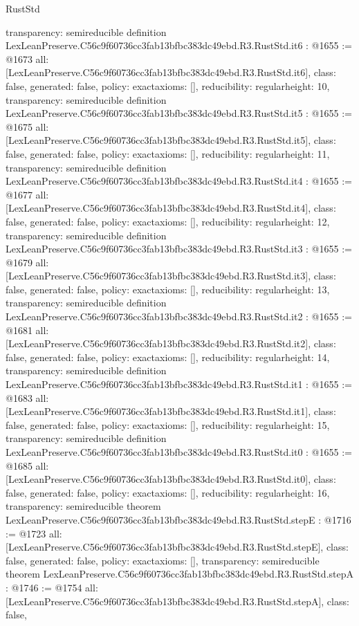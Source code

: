 \begin{lexlean}{RustStd}
\begin{coremodule}
{  transparency: semireducible
}
definition LexLeanPreserve.C56c9f60736cc3fab13bfbc383dc49ebd.R3.RustStd.it6 : @1655 := @1673 {
  all: [LexLeanPreserve.C56c9f60736cc3fab13bfbc383dc49ebd.R3.RustStd.it6],
  class: false,
  generated: false,
  policy: exact{axioms: []},
  reducibility: regular{height: 10},
  transparency: semireducible
}
definition LexLeanPreserve.C56c9f60736cc3fab13bfbc383dc49ebd.R3.RustStd.it5 : @1655 := @1675 {
  all: [LexLeanPreserve.C56c9f60736cc3fab13bfbc383dc49ebd.R3.RustStd.it5],
  class: false,
  generated: false,
  policy: exact{axioms: []},
  reducibility: regular{height: 11},
  transparency: semireducible
}
definition LexLeanPreserve.C56c9f60736cc3fab13bfbc383dc49ebd.R3.RustStd.it4 : @1655 := @1677 {
  all: [LexLeanPreserve.C56c9f60736cc3fab13bfbc383dc49ebd.R3.RustStd.it4],
  class: false,
  generated: false,
  policy: exact{axioms: []},
  reducibility: regular{height: 12},
  transparency: semireducible
}
definition LexLeanPreserve.C56c9f60736cc3fab13bfbc383dc49ebd.R3.RustStd.it3 : @1655 := @1679 {
  all: [LexLeanPreserve.C56c9f60736cc3fab13bfbc383dc49ebd.R3.RustStd.it3],
  class: false,
  generated: false,
  policy: exact{axioms: []},
  reducibility: regular{height: 13},
  transparency: semireducible
}
definition LexLeanPreserve.C56c9f60736cc3fab13bfbc383dc49ebd.R3.RustStd.it2 : @1655 := @1681 {
  all: [LexLeanPreserve.C56c9f60736cc3fab13bfbc383dc49ebd.R3.RustStd.it2],
  class: false,
  generated: false,
  policy: exact{axioms: []},
  reducibility: regular{height: 14},
  transparency: semireducible
}
definition LexLeanPreserve.C56c9f60736cc3fab13bfbc383dc49ebd.R3.RustStd.it1 : @1655 := @1683 {
  all: [LexLeanPreserve.C56c9f60736cc3fab13bfbc383dc49ebd.R3.RustStd.it1],
  class: false,
  generated: false,
  policy: exact{axioms: []},
  reducibility: regular{height: 15},
  transparency: semireducible
}
definition LexLeanPreserve.C56c9f60736cc3fab13bfbc383dc49ebd.R3.RustStd.it0 : @1655 := @1685 {
  all: [LexLeanPreserve.C56c9f60736cc3fab13bfbc383dc49ebd.R3.RustStd.it0],
  class: false,
  generated: false,
  policy: exact{axioms: []},
  reducibility: regular{height: 16},
  transparency: semireducible
}
theorem LexLeanPreserve.C56c9f60736cc3fab13bfbc383dc49ebd.R3.RustStd.stepE : @1716 := @1723 {
  all: [LexLeanPreserve.C56c9f60736cc3fab13bfbc383dc49ebd.R3.RustStd.stepE],
  class: false,
  generated: false,
  policy: exact{axioms: []},
  transparency: semireducible
}
theorem LexLeanPreserve.C56c9f60736cc3fab13bfbc383dc49ebd.R3.RustStd.stepA : @1746 := @1754 {
  all: [LexLeanPreserve.C56c9f60736cc3fab13bfbc383dc49ebd.R3.RustStd.stepA],
  class: false,
}
\end{coremodule}
\end{lexlean}
